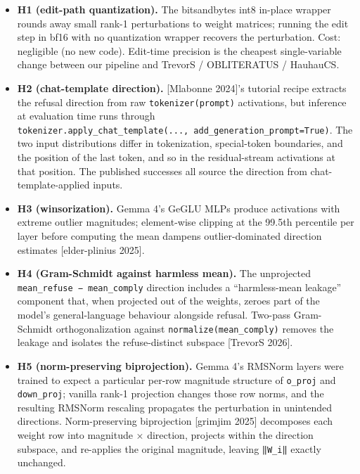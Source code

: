 \documentclass[
  11pt,
]{article}
\providecommand{\tightlist}{%
  \setlength{\itemsep}{0pt}\setlength{\parskip}{0pt}}
\begin{document}
\begin{itemize}
\tightlist
\item
  \textbf{H1 (edit-path quantization).} The bitsandbytes int8 in-place
  wrapper rounds away small rank-1 perturbations to weight matrices;
  running the edit step in bf16 with no quantization wrapper recovers
  the perturbation. Cost: negligible (no new code). Edit-time precision
  is the cheapest single-variable change between our pipeline and
  TrevorS / OBLITERATUS / HauhauCS.
\item
  \textbf{H2 (chat-template direction).} {[}Mlabonne 2024{]}'s tutorial
  recipe extracts the refusal direction from raw
  \texttt{tokenizer(prompt)} activations, but inference at evaluation
  time runs through
  \texttt{tokenizer.apply\_chat\_template(...,\ add\_generation\_prompt=True)}.
  The two input distributions differ in tokenization, special-token
  boundaries, and the position of the last token, and so in the
  residual-stream activations at that position. The published successes
  all source the direction from chat-template-applied inputs.
\item
  \textbf{H3 (winsorization).} Gemma 4's GeGLU MLPs produce activations
  with extreme outlier magnitudes; element-wise clipping at the 99.5th
  percentile per layer before computing the mean dampens
  outlier-dominated direction estimates {[}elder-plinius 2025{]}.
\item
  \textbf{H4 (Gram-Schmidt against harmless mean).} The unprojected
  \texttt{mean\_refuse\ −\ mean\_comply} direction includes a
  ``harmless-mean leakage'' component that, when projected out of the
  weights, zeroes part of the model's general-language behaviour
  alongside refusal. Two-pass Gram-Schmidt orthogonalization against
  \texttt{normalize(mean\_comply)} removes the leakage and isolates the
  refuse-distinct subspace {[}TrevorS 2026{]}.
\item
  \textbf{H5 (norm-preserving biprojection).} Gemma 4's RMSNorm layers
  were trained to expect a particular per-row magnitude structure of
  \texttt{o\_proj} and \texttt{down\_proj}; vanilla rank-1 projection
  changes those row norms, and the resulting RMSNorm rescaling
  propagates the perturbation in unintended directions. Norm-preserving
  biprojection {[}grimjim 2025{]} decomposes each weight row into
  magnitude × direction, projects within the direction subspace, and
  re-applies the original magnitude, leaving \texttt{‖W\_i‖} exactly
  unchanged.
\end{itemize}
\end{document}
